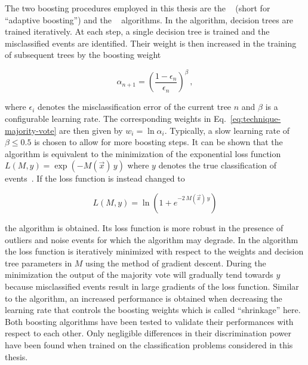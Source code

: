 The two boosting procedures employed in this thesis are the \ADABOOST[format=hyperbf]~\cite{FREUND1997119} (short for ``adaptive boosting'') and the \GRADIENTBOOST[format=hyperbf]~\cite{Friedman00greedyfunction} algorithms. In the \ADABOOST algorithm, decision trees are trained iteratively. At each step, a single decision tree is trained and the misclassified events are identified. Their weight is then increased in the training of subsequent trees by the boosting weight

\begin{equation}
\alpha_{n+1}=\left(\frac{1-\epsilon_{n}}{\epsilon_{n}}\right)^\beta\,,
\end{equation}

where $\epsilon_{i}$ denotes the misclassification error of the current tree $n$ and $\beta$ is a configurable learning rate. The corresponding weights in Eq.~\ref{eq:technique-majority-vote} are then given by $w_{i}=\ln\alpha_{i}$. Typically, a slow learning rate of $\beta\leq0.5$ is chosen to allow for more boosting steps. It can be shown that the \ADABOOST algorithm is equivalent to the minimization of the exponential loss function $L(M,y)=\exp(-M(\vec{x})\,y)$ where $y$ denotes the true classification of events~\cite{Hocker:2007ht}. If the loss function is instead changed to 

\begin{equation}
L(M,y)=\ln\left(1+e^{-2\,M(\vec{x})\,y}\right)
\end{equation}

the \GRADIENTBOOST algorithm is obtained. Its loss function is more robust in the presence of outliers and noise events for which the \ADABOOST algorithm may degrade. In the \GRADIENTBOOST algorithm the loss function is iteratively minimized with respect to the weights and decision tree parameters in $M$ using the method of gradient descent. During the minimization the output of the majority vote will gradually tend towards $y$ because misclassified events result in large gradients of the loss function. Similar to the \ADABOOST algorithm, an increased performance is obtained when decreasing the learning rate that controls the boosting weights which is called ``shrinkage'' here. Both boosting algorithms have been tested to validate their performances with respect to each other. Only negligible differences in their discrimination power have been found when trained on the classification problems considered in this thesis.

